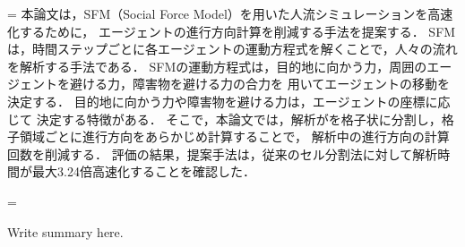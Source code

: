 %
%








%



={
本論文は，SFM（Social Force Model）を用いた人流シミュレーションを高速化するために， エージェントの進行方向計算を削減する手法を提案する．
SFMは，時間ステップごとに各エージェントの運動方程式を解くことで，人々の流れを解析する手法である．
SFMの運動方程式は，目的地に向かう力，周囲のエージェントを避ける力，障害物を避ける力の合力を
用いてエージェントの移動を決定する．
目的地に向かう力や障害物を避ける力は，エージェントの座標に応じて
決定する特徴がある．
そこで，本論文では，解析がを格子状に分割し，格子領域ごとに進行方向をあらかじめ計算することで，
解析中の進行方向の計算回数を削減する．
評価の結果，提案手法は，従来のセル分割法に対して解析時間が最大3.24倍高速化することを確認した．
}%


={

Write summary here.

}%
